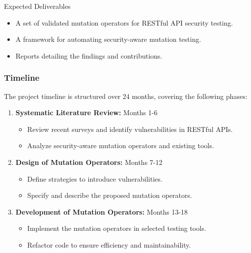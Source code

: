 \documentclass[12pt]{beamer}
\theoremstyle{remark}
\theoremstyle{definition}
\begin{document}
\begin{frame}[allowframebreaks]
\begin{block}{Expected Deliverables}
\begin{itemize}
    \item A set of validated mutation operators for RESTful API security testing.
    \item A framework for automating security-aware mutation testing.
    \item Reports detailing the findings and contributions.
\end{itemize}
\end{block}
\end{frame}


\begin{frame}[allowframebreaks]
\frametitle{Timeline}
The project timeline is structured over 24 months, covering the following phases:

\begin{enumerate}
    \item \textbf{Systematic Literature Review:} Months 1-6
    \begin{itemize}
        \item Review recent surveys and identify vulnerabilities in RESTful APIs.
        \item Analyze security-aware mutation operators and existing tools.
    \end{itemize}

    \item \textbf{Design of Mutation Operators:} Months 7-12
    \begin{itemize}
        \item Define strategies to introduce vulnerabilities.
        \item Specify and describe the proposed mutation operators.
    \end{itemize}

    \item \textbf{Development of Mutation Operators:} Months 13-18
    \begin{itemize}
        \item Implement the mutation operators in selected testing tools.
        \item Refactor code to ensure efficiency and maintainability.
    \end{itemize}


\end{enumerate}
\end{frame}
\end{document}
